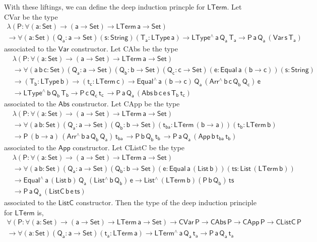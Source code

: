 \documentclass[acmsmall,screen,review,anonymous]{acmart}
\theoremstyle{definition}
\begin{document}
With these liftings, we can define the deep induction princple for $\mathsf{LTerm}$.
Let CVar be the type 
\begin{multline*}
\mathsf{\lambda (P : \forall (a : Set) \to (a \to Set) \to LTerm\,a \to Set)} \\
\mathsf{\to 
  \forall (a : Set) (Q_a : a \to Set) (s : String) (T_a : LType\, a) 
  \to LType^{\wedge} \, a\, Q_a\, T_a
  \to P \, a\, Q_a\, (Var \, s\, T_a)
  }
\end{multline*}
associated to the $\mathsf{Var}$ constructor. 
Let CAbs be the type 
\begin{align*}
  &\mathsf{\lambda (P : \forall (a : Set) \to (a \to Set) \to LTerm\,a \to Set)} \\
  &\mathsf{\to 
  \forall (a \,b\, c: Set) (Q_a : a \to Set)  (Q_b : b \to Set) (Q_c : c \to Set)
  (e : Equal\, a\, (b \to c)) (s : String) } \\ 
  &\mathsf{ \to (T_b : LType\, b) \to (t_c : LTerm\, c)
  \to Equal^{\wedge}\,a\,(b \to c)\, Q_a \, (Arr^{\wedge} \, b\, c\, Q_b \, Q_c) \, e
  } \\
  &\mathsf{
  \to LType^{\wedge}\, b\, Q_b\, T_b
  \to P\, c\, Q_c\, t_c\, 
  \to P \, a\, Q_a\, (Abs \,b \,c \, e \,s \,T_b \, t_c)
  }
\end{align*}
associated to the $\mathsf{Abs}$ constructor. 
Let CApp be the type 
\begin{align*}
  &\mathsf{\lambda (P : \forall (a : Set) \to (a \to Set) \to LTerm\,a \to Set)} \\
  &\mathsf{\to 
  \forall (a \,b : Set) (Q_a : a \to Set)  (Q_b : b \to Set) 
   (t_{ba} : LTerm\, (b \to a)) (t_b : LTerm\, b)} \\
  &\mathsf{
  \to P\, (b \to a)\, (Arr^{\wedge} \, b\, a\, Q_b \, Q_a) \, t_{ba} \, 
  \to P\, b\, Q_b\, t_b\, 
  \to P \, a\, Q_a\, (App \,b \,t_{ba} \, t_b) }
\end{align*}
associated to the $\mathsf{App}$ constructor. 
Let CListC be the type 
\begin{align*}
  &\mathsf{\lambda (P : \forall (a : Set) \to (a \to Set) \to LTerm\,a \to Set)} \\
  &\mathsf{\to 
  \forall (a \,b : Set) (Q_a : a \to Set)  (Q_b : b \to Set) 
    (e : Equal\, a\, (List\, b)) (ts : List\, (LTerm\, b))} \\ 
  &\mathsf{
    \to Equal^{\wedge}\, a\, (List\,b)\, Q_a\, (List^{\wedge}\, b\, Q_b)\, e 
  \to List^{\wedge}\, (LTerm\,b) (P\, b\, Q_b)\, ts} \\
&\mathsf{
  \to P \, a\, Q_a\, (ListC \,b \,e \, ts) }
\end{align*}
associated to the $\mathsf{ListC}$ constructor. 
Then the type of the deep induction principle for $\mathsf{LTerm}$ is,
\begin{multline*}
\mathsf{\forall (P : \forall (a : Set) \to (a \to Set) \to LTerm\,a \to Set)}
\mathsf{\to CVar\,P \to CAbs\,P \to CApp\,P \to CListC\,P} \\
\mathsf{\to \forall (a : Set)(Q_a : a \to Set)(t_a : LTerm\,a) \to LTerm^{\wedge}\,a\,Q_a\,t_a \to P\,a\,Q_a\,t_a}
\end{multline*}
\end{document}
